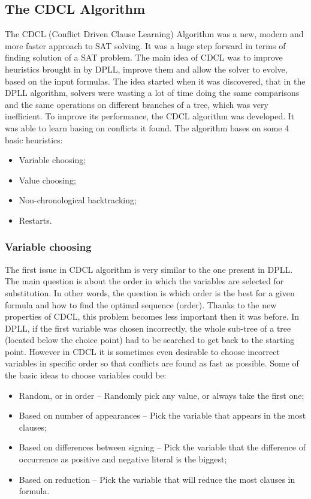 \documentclass[12pt,english,pdflatex]{aghdpl}
\begin{document}
\subsection{The CDCL Algorithm}
\label{subsec:CDCL}

The CDCL (Conflict Driven Clause Learning)\cite{Biere:2009} Algorithm was a new, modern
and more faster approach to SAT solving. It was a huge step forward
in terms of finding solution of a SAT problem. The main idea of CDCL
was to improve heuristics brought in by DPLL, improve them and allow
the solver to evolve, based on the input formulas. The idea started when it
was discovered, that in the DPLL algorithm, solvers were wasting a lot
of time doing the same comparisons and the same operations on different branches
of a tree, which was very inefficient. To improve its performance,
the CDCL algorithm was developed. It was able to learn basing on conflicts
it found. The algorithm bases on some 4 basic heuristics:
\begin{itemize}
\item Variable choosing;
\item Value choosing;
\item Non-chronological backtracking;
\item Restarts.
\end{itemize}

\subsubsection{Variable choosing}
\label{subsubsec:Variable}
The first issue in CDCL algorithm is very similar to the one present
in DPLL. The main question is about the order in which the  variables are selected
for substitution. In other words, the question is which order is the best for a given formula and
how to find the optimal sequence (order). Thanks to the new properties of CDCL, this
problem becomes less important then it was before. In DPLL, if the
first variable was chosen incorrectly, the whole sub-tree  of a tree (located below the choice point) had
to be searched to get back to the starting point. However in CDCL it is
sometimes even desirable to choose incorrect variables in specific
order so that conflicts are found as fast as possible. Some of the
basic ideas to choose variables could be:
\begin{itemize}
\item Random, or in order -- Randomly pick any value, or always take the first one;
\item Based on number of appearances -- Pick the variable that appears in the most clauses;
\item Based on differences between signing -- Pick the variable that the difference of occurrence as positive and negative literal is the biggest;
\item Based on reduction -- Pick the variable that will reduce the most clauses in formula.
\end{itemize}
\end{document}
